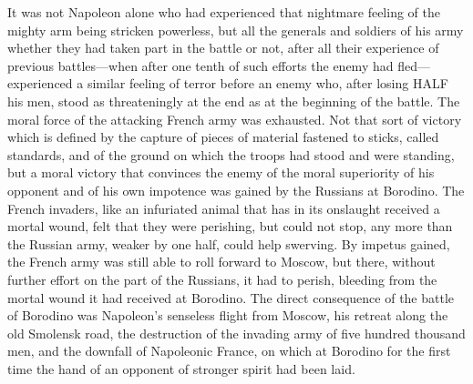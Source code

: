 It was not Napoleon alone who had experienced that nightmare
feeling of the mighty arm being stricken powerless, but all the
generals and soldiers of his army whether they had taken part in
the battle or not, after all their experience of previous
battles---when after one tenth of such efforts the enemy had
fled---experienced a similar feeling of terror before an enemy
who, after losing HALF his men, stood as threateningly at the end
as at the beginning of the battle. The moral force of the
attacking French army was exhausted. Not that sort of victory
which is defined by the capture of pieces of material fastened to
sticks, called standards, and of the ground on which the troops
had stood and were standing, but a moral victory that convinces
the enemy of the moral superiority of his opponent and of his own
impotence was gained by the Russians at Borodino. The French
invaders, like an infuriated animal that has in its onslaught
received a mortal wound, felt that they were perishing, but could
not stop, any more than the Russian army, weaker by one half,
could help swerving. By impetus gained, the French army was still
able to roll forward to Moscow, but there, without further effort
on the part of the Russians, it had to perish, bleeding from the
mortal wound it had received at Borodino. The direct consequence
of the battle of Borodino was Napoleon's senseless flight from
Moscow, his retreat along the old Smolensk road, the destruction
of the invading army of five hundred thousand men, and the
downfall of Napoleonic France, on which at Borodino for the first
time the hand of an opponent of stronger spirit had been laid.